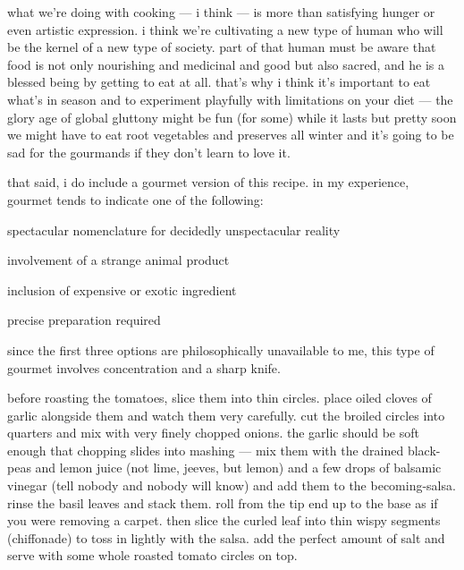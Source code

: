 what we're doing with cooking --- i think --- is more than satisfying
hunger or even artistic expression. i think we're cultivating a new
type of human who will be the kernel of a new type of society. part of
that human must be aware that food is not only nourishing and
medicinal and good but also sacred, and he is a blessed being by
getting to eat at all. that's why i think it's important to eat what's
in season and to experiment playfully with limitations on your diet
--- the glory age of global gluttony might be fun (for some) while it
lasts but pretty soon we might have to eat root vegetables and
preserves all winter and it's going to be sad for the gourmands if
they don't learn to love it.

that said, i do include a gourmet version of this recipe. in my
experience, gourmet tends to indicate one of the following:

\begin{ingredients}
  \item spectacular nomenclature for decidedly unspectacular reality
  \item involvement of a strange animal product
  \item inclusion of expensive or exotic ingredient
  \item precise preparation required
\end{ingredients}

since the first three options are philosophically unavailable to me,
this type of gourmet involves concentration and a sharp knife.

before roasting the tomatoes, slice them into thin circles. place
oiled cloves of garlic alongside them and watch them very
carefully. cut the broiled circles into quarters and mix with very
finely chopped onions. the garlic should be soft enough that chopping
slides into mashing --- mix them with the drained black-peas and lemon
juice (not lime, jeeves, but lemon) and a few drops of balsamic
vinegar (tell nobody and nobody will know) and add them to the
becoming-salsa. rinse the basil leaves and stack them. roll from the
tip end up to the base as if you were removing a carpet. then slice
the curled leaf into thin wispy segments (chiffonade) to toss in
lightly with the salsa. add the perfect amount of salt and serve with
some whole roasted tomato circles on top.
